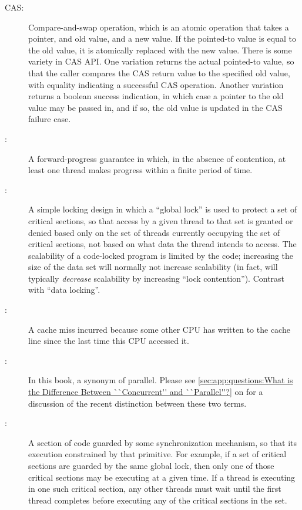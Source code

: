 \begin{description}
\item[CAS:]
	Compare-and-swap operation, which is an atomic operation that
	takes a pointer, and old value, and a new value.
	If the pointed-to value is equal to the old value, it is atomically
	replaced with the new value.
	There is some variety in CAS API\@.
	One variation returns the actual pointed-to value, so that the
	caller compares the CAS return value to the specified old value,
	with equality indicating a successful CAS operation.
	Another variation returns a boolean success indication, in which
	case a pointer to the old value may be passed in, and if so,
	the old value is updated in the CAS failure case.
\item[:]
	A forward-progress guarantee in which, in the absence of
	contention, at least one thread makes progress within a finite
	period of time.
\item[:]
	A simple locking design in which a ``global lock'' is used to protect
	a set of critical sections, so that access by a given thread
	to that set is
	granted or denied based only on the set of threads currently
	occupying the set of critical sections, not based on what
	data the thread intends to access.
	The scalability of a code-locked program is limited by the code;
	increasing the size of the data set will normally not increase
	scalability (in fact, will typically \emph{decrease} scalability
	by increasing ``lock contention'').
	Contrast with ``data locking''.
\item[:]
	A cache miss incurred because some other CPU has written to
	the cache line since the last time this CPU accessed it.
\item[:]
	In this book, a synonym of parallel.
	Please see \cref{sec:app:questions:What is the Difference Between ``Concurrent'' and ``Parallel''?}
	on 
	for a discussion of the recent distinction between these two
	terms.
\item[:]
	A section of code guarded by some synchronization mechanism,
	so that its execution constrained by that primitive.
	For example, if a set of critical sections are guarded by
	the same global lock, then only one of those critical sections
	may be executing at a given time.
	If a thread is executing in one such critical section,
	any other threads must wait until the first thread completes
	before executing any of the critical sections in the set.

\end{description}
